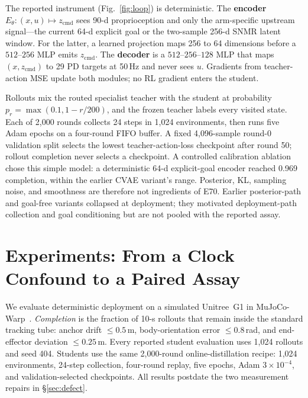 \documentclass[conference]{IEEEtran}
\newcommand{\zcmd}{\ensuremath{z_{\mathrm{cmd}}}}
\newcommand{\snmr}{SNMR}
\begin{document}
The reported instrument (Fig.~\ref{fig:loop}) is deterministic. The \textbf{encoder}
$E_\theta:(x,u)\mapsto\zcmd$ sees 90-d proprioception and only the arm-specific upstream
signal---the current 64-d explicit goal or the two-sample 256-d \snmr{} latent window.
For the latter, a learned projection maps 256 to 64 dimensions before a
$512$--$256$ MLP emits \zcmd{}. The \textbf{decoder} is a $512$--$256$--$128$ MLP
that maps $(x,\zcmd)$ to 29 PD targets at 50\,Hz and never sees $u$. Gradients from
teacher-action MSE update both modules; no RL gradient enters the student.

Rollouts mix the routed specialist teacher with the student at probability
$p_r=\max(0.1,1-r/200)$, and the frozen teacher labels every visited state. Each of
2,000 rounds collects 24 steps in 1,024 environments, then runs five Adam epochs on a
four-round FIFO buffer. A fixed 4,096-sample round-0 validation split selects the
lowest teacher-action-loss checkpoint after round 50; rollout completion never selects
a checkpoint. A controlled calibration ablation chose this simple model: a
deterministic 64-d explicit-goal encoder reached 0.969 completion, within the earlier
CVAE variant's range. Posterior, KL, sampling noise, and smoothness are therefore not
ingredients of E70. Earlier posterior-path and goal-free variants collapsed at
deployment; they motivated deployment-path collection and goal conditioning but are
not pooled with the reported assay.

\section{Experiments: From a Clock Confound to a Paired Assay}
\label{sec:exp}
We evaluate deterministic deployment on a simulated Unitree~G1 in
MuJoCo-Warp~\cite{mujoco}.
\emph{Completion} is the fraction of 10-s rollouts that remain inside the standard
tracking tube: anchor drift $\leq0.5$\,m, body-orientation error $\leq0.8$\,rad, and
end-effector deviation $\leq0.25$\,m.  Every reported student evaluation uses 1,024
rollouts and seed 404.  Students use the same 2,000-round online-distillation recipe:
1,024 environments, 24-step collection, four-round replay, five epochs, Adam
$3{\times}10^{-4}$, and validation-selected checkpoints.  All results postdate the two
measurement repairs in \S\ref{sec:defect}.
\end{document}
